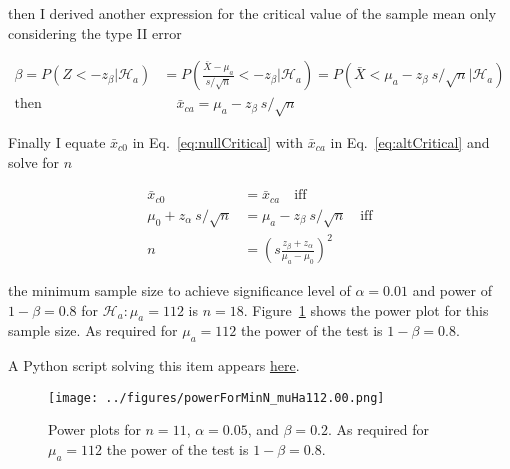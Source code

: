 \documentclass[12pt]{article}
\begin{document}
\begin{enumerate}
\begin{enumerate}
                then I derived another expression for the critical value of the
                sample mean only considering the type II error

                \begin{align}
                    \beta=P(Z<-z_\beta|\mathcal{H}_a)&=P(\frac{\bar{X}-\mu_a}{s/\sqrt{n}}<-z_\beta|\mathcal{H}_a)=P(\bar{X}<\mu_a-z_\beta\
                    s/\sqrt{n}|\mathcal{H}_a)\nonumber\\
                    \text{then}&\quad\bar{x}_{ca}=\mu_a-z_\beta\ s/\sqrt{n}\label{eq:altCritical}
                \end{align}

                Finally I equate $\bar{x}_{c0}$ in Eq.~\ref{eq:nullCritical}
                with $\bar{x}_{ca}$ in Eq.~\ref{eq:altCritical} and solve for
                $n$

                \begin{align*}
                    \bar{x}_{c0}&=\bar{x}_{ca}\quad\text{iff}\\
                    \mu_0+z_\alpha\ s/\sqrt{n}&=\mu_a-z_\beta\ s/\sqrt{n}\quad\text{iff}\\
                    n&=\left(s\frac{z_\beta+z_\alpha}{\mu_a-\mu_0}\right)^2
                \end{align*}

                the minimum sample size to achieve significance level of
                $\alpha=0.01$ and power of $1-\beta=0.8$ for $\mathcal{H}_a:
                \mu_a=112$ is $n=18$. Figure~\ref{fig:powerPlotForMinN} shows
                the power plot for this sample size. As required for
                $\mu_a=112$ the power of the test is $1-\beta=0.8$.

                A Python script solving this item appears
                \href{https://github.com/joacorapela/neuroinformatics24/blob/master/worksheets/01_tTestAndRandomizationTests/mySolution/code/doPowerExd.py}{here}.

                \begin{figure}
                    \begin{center}
                        \texttt{[image: ../figures/powerForMinN\_muHa112.00.png]}
                    \end{center}
                    \caption{Power plots for $n=11$, $\alpha=0.05$, and
                    $\beta=0.2$. As required for $\mu_a=112$ the power of the
                    test is $1-\beta=0.8$.}
                    \label{fig:powerPlotForMinN}
                \end{figure}


        \end{enumerate}
\end{enumerate}
\end{document}
